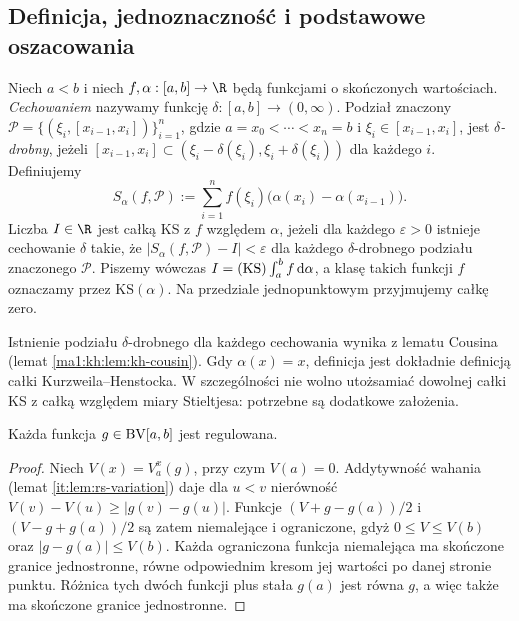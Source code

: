 \subsection*{Definicja, jednoznaczność i podstawowe oszacowania}
\begin{definicja}
Niech $a<b$ i niech $f,\alpha:[a,b]\to\R$ będą funkcjami o skończonych wartościach. \emph{Cechowaniem} nazywamy funkcję $\delta:[a,b]\to(0,\infty)$. Podział znaczony $\mathcal P=\{(\xi_i,[x_{i-1},x_i])\}_{i=1}^n$, gdzie $a=x_0<\cdots<x_n=b$ i $\xi_i\in[x_{i-1},x_i]$, jest \emph{$\delta$-drobny}, jeżeli $[x_{i-1},x_i]\subset(\xi_i-\delta(\xi_i),\xi_i+\delta(\xi_i))$ dla każdego $i$. Definiujemy
\[
 S_\alpha(f,\mathcal P):=\sum_{i=1}^n f(\xi_i)\bigl(\alpha(x_i)-\alpha(x_{i-1})\bigr).
\]
Liczba $I\in\R$ jest całką KS z $f$ względem $\alpha$, jeżeli dla każdego $\varepsilon>0$ istnieje cechowanie $\delta$ takie, że $|S_\alpha(f,\mathcal P)-I|<\varepsilon$ dla każdego $\delta$-drobnego podziału znaczonego $\mathcal P$. Piszemy wówczas $I=(\mathrm{KS})\int_a^b f\,\mathrm d\alpha$, a klasę takich funkcji $f$ oznaczamy przez $\mathrm{KS}(\alpha)$. Na przedziale jednopunktowym przyjmujemy całkę zero.
\end{definicja}
Istnienie podziału $\delta$-drobnego dla każdego cechowania wynika z lematu Cousina (lemat \ref{ma1:kh:lem:kh-cousin}). Gdy $\alpha(x)=x$, definicja jest dokładnie definicją całki Kurzweila--Henstocka. W szczególności nie wolno utożsamiać dowolnej całki KS z całką względem miary Stieltjesa: potrzebne są dodatkowe założenia.

\begin{lemat}\label{it:lem:ks-bv-regulated}
Każda funkcja $g\in\mathrm{BV}[a,b]$ jest regulowana.
\end{lemat}
\begin{proof}
Niech $V(x)=V_a^x(g)$, przy czym $V(a)=0$. Addytywność wahania (lemat \ref{it:lem:rs-variation}) daje dla $u<v$ nierówność $V(v)-V(u)\ge|g(v)-g(u)|$. Funkcje $(V+g-g(a))/2$ i $(V-g+g(a))/2$ są zatem niemalejące i ograniczone, gdyż $0\le V\le V(b)$ oraz $|g-g(a)|\le V(b)$. Każda ograniczona funkcja niemalejąca ma skończone granice jednostronne, równe odpowiednim kresom jej wartości po danej stronie punktu. Różnica tych dwóch funkcji plus stała $g(a)$ jest równa $g$, a więc także ma skończone granice jednostronne.
\end{proof}

